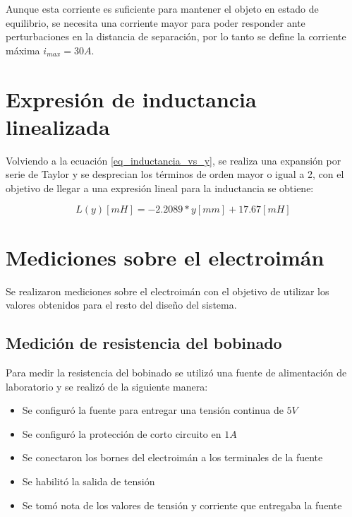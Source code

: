 \noindent Aunque esta corriente es suficiente para mantener el objeto en estado de equilibrio, se necesita una corriente mayor para poder responder ante perturbaciones en la distancia de separación, por lo tanto se define la corriente máxima $i_{max}=30A$.



\section{Expresión de inductancia linealizada}

\noindent Volviendo a la ecuación \ref{eq_inductancia_vs_y}, se realiza una expansión por serie de Taylor y se desprecian los términos de orden mayor o igual a 2, con el objetivo de llegar a una expresión lineal para la inductancia se obtiene:

\begin{equation} \label{eq_inductancia_lineal_teorica}
	L(y)[mH]=-2.2089*y[mm]+17.67 [mH]
\end{equation}

\section{Mediciones sobre el electroimán}

\noindent Se realizaron mediciones sobre el electroimán con el objetivo de utilizar los valores obtenidos para el resto del diseño del sistema.

\subsection{Medición de resistencia del bobinado}

\noindent Para medir la resistencia del bobinado se utilizó una fuente de alimentación de laboratorio y se realizó de la siguiente manera:

\begin{itemize}
	\item Se configuró la fuente para entregar una tensión continua de $5V$
	\item Se configuró la protección de corto circuito en $1A$
	\item Se conectaron los bornes del electroimán a los terminales de la fuente
	\item Se habilitó la salida de tensión
	\item Se tomó nota de los valores de tensión y corriente que entregaba la fuente
\end{itemize}


